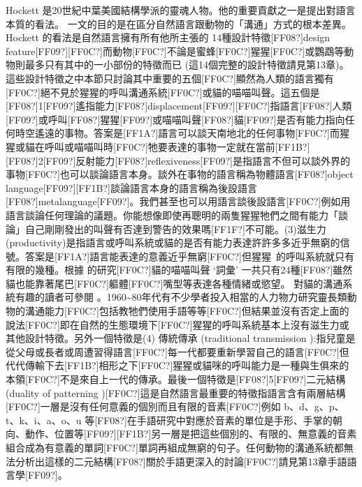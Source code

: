 Hockett 是20世紀中葉美國結構學派的靈魂人物。他的重要貢獻之一是提出對語言本質的看法。\citet{Hockett1960} 一文的目的是在區分自然語言跟動物的「溝通」方式的根本差異。Hockett 的看法是自然語言擁有所有他所主張的 14種設計特徵[FF08?]design feature[FF09?][FF0C?]而動物[FF0C?]不論是蜜蜂[FF0C?]猩猩[FF0C?]或鸚鵡等動物則最多只有其中的一小部份的特徵而已 (這14個完整的設計特徵請見第13章)。這些設計特徵之中本節只討論其中重要的五個[FF0C?]顯然為人類的語言獨有[FF0C?]絕不見於猩猩的呼叫溝通系統[FF0C?]或貓的喵喵叫聲。這五個是[FF08?]1[FF09?]遙指能力[FF08?]displacement[FF09?][FF0C?]指語言[FF08?]人類[FF09?]或呼叫[FF08?]猩猩[FF09?]或喵喵叫聲[FF08?]貓[FF09?]是否有能力指向任何時空遙遠的事物。答案是[FF1A?]語言可以談天南地北的任何事物[FF0C?]而猩猩或貓在呼叫或喵喵叫時[FF0C?]牠要表達的事物一定就在當前[FF1B?][FF08?]2[FF09?]反射能力[FF08?]reflexiveness[FF09?]是指語言不但可以談外界的事物[FF0C?]也可以談論語言本身。談外在事物的語言稱為物體語言[FF08?]object language[FF09?][FF1B?]談論語言本身的語言稱為後設語言[FF08?]metalanguage[FF09?]。我們甚至也可以用語言談後設語言[FF0C?]例如用語言談論任何理論的議題。你能想像即使再聰明的兩隻猩猩牠們之間有能力「談論」自己剛剛發出的叫聲有否達到警告的效果嗎[FF1F?]不可能。(3)滋生力 (productivity)是指語言或呼叫系統或貓的是否有能力表達許許多多近乎無窮的信號。答案是[FF1A?]語言能表達的意義近乎無窮[FF0C?]但猩猩~的呼叫系統就只有有限的幾種。根據\citet{NewmanWeitzman2015} 的研究[FF0C?]貓的喵喵叫聲 ‘詞彙’ 一共只有24種[FF08?]雖然貓也能靠著尾巴[FF0C?]軀體[FF0C?]嘴型等表達各種情緒或慾望。 對貓的溝通系統有趣的讀者可參閱 \citet{Schötz2018}。1960{\textasciitilde}80年代有不少學者投入相當的人力物力研究靈長類動物的溝通能力[FF0C?]包括教牠們使用手語等等[FF0C?]但結果並沒有否定上面的說法[FF0C?]即在自然的生態環境下[FF0C?]猩猩的呼叫系統基本上沒有滋生力或其他設計特徵。另外一個特徵是(4) 傳統傳承 (traditional transmission ):指兒童是從父母或長者或周遭習得語言[FF0C?]每一代都要重新學習自己的語言[FF0C?]但代代傳輸下去[FF1B?]相形之下[FF0C?]猩猩或貓咪的呼叫能力是一種與生俱來的本領[FF0C?]不是來自上一代的傳承。最後一個特徵是[FF08?]5[FF09?]二元結構 (duality of patterning )[FF0C?]這是自然語言最重要的特徵指語言含有兩層結構[FF0C?]一層是沒有任何意義的個別而且有限的音素[FF0C?]例如 b、d、g、p、t、k、i、a、o、u 等[FF08?]在手語研究中對應於音素的單位是手形、手掌的朝向、動作、位置等[FF09?][FF1B?]另一層是把這些個別的、有限的、無意義的音素組合成為有意義的單詞[FF0C?]單詞再組成無窮的句子。任何動物的溝通系統都無法分析出這樣的二元結構[FF08?]關於手語更深入的討論[FF0C?]請見第13章手語語言學[FF09?]。

